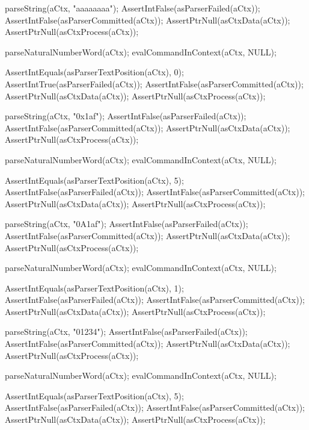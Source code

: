 \startCTest
  parseString(aCtx, "aaaaaaaa");
  AssertIntFalse(asParserFailed(aCtx));
  AssertIntFalse(asParserCommitted(aCtx));
  AssertPtrNull(asCtxData(aCtx));
  AssertPtrNull(asCtxProcess(aCtx));
  
  parseNaturalNumberWord(aCtx);
  evalCommandInContext(aCtx, NULL);
  
  AssertIntEquals(asParserTextPosition(aCtx), 0);
  AssertIntTrue(asParserFailed(aCtx));
  AssertIntFalse(asParserCommitted(aCtx));
  AssertPtrNull(asCtxData(aCtx));
  AssertPtrNull(asCtxProcess(aCtx));
\stopCTest
\stopTestCase

\startCTest
  parseString(aCtx, "0x1af");
  AssertIntFalse(asParserFailed(aCtx));
  AssertIntFalse(asParserCommitted(aCtx));
  AssertPtrNull(asCtxData(aCtx));
  AssertPtrNull(asCtxProcess(aCtx));
  
  parseNaturalNumberWord(aCtx);
  evalCommandInContext(aCtx, NULL);
  
  AssertIntEquals(asParserTextPosition(aCtx), 5);
  AssertIntFalse(asParserFailed(aCtx));
  AssertIntFalse(asParserCommitted(aCtx));
  AssertPtrNull(asCtxData(aCtx));
  AssertPtrNull(asCtxProcess(aCtx));
  
  parseString(aCtx, "0A1af");
  AssertIntFalse(asParserFailed(aCtx));
  AssertIntFalse(asParserCommitted(aCtx));
  AssertPtrNull(asCtxData(aCtx));
  AssertPtrNull(asCtxProcess(aCtx));
  
  parseNaturalNumberWord(aCtx);
  evalCommandInContext(aCtx, NULL);
  
  AssertIntEquals(asParserTextPosition(aCtx), 1);
  AssertIntFalse(asParserFailed(aCtx));
  AssertIntFalse(asParserCommitted(aCtx));
  AssertPtrNull(asCtxData(aCtx));
  AssertPtrNull(asCtxProcess(aCtx));
  
  parseString(aCtx, "01234");
  AssertIntFalse(asParserFailed(aCtx));
  AssertIntFalse(asParserCommitted(aCtx));
  AssertPtrNull(asCtxData(aCtx));
  AssertPtrNull(asCtxProcess(aCtx));
  
  parseNaturalNumberWord(aCtx);
  evalCommandInContext(aCtx, NULL);
  
  AssertIntEquals(asParserTextPosition(aCtx), 5);
  AssertIntFalse(asParserFailed(aCtx));
  AssertIntFalse(asParserCommitted(aCtx));
  AssertPtrNull(asCtxData(aCtx));
  AssertPtrNull(asCtxProcess(aCtx));
\stopCTest
\stopTestCase
\stopTestSuite

\startTestSuite[parseSingleQuoteWord]

